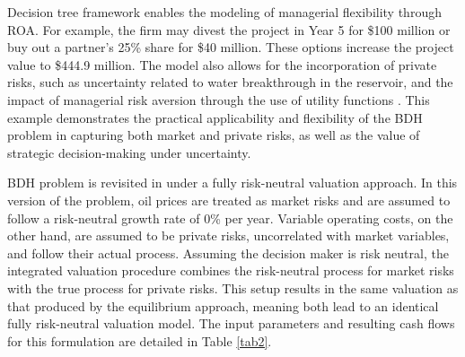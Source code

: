 \documentclass[pdflatex,sn-basic]{sn-jnl}%
\theoremstyle{thmstyleone}%
\theoremstyle{thmstyletwo}%
\theoremstyle{thmstylethree}%
\begin{document}
Decision tree framework enables the modeling of managerial flexibility through ROA. For example, the firm may divest the project in Year 5 for \$100 million or buy out a partner's 25\% share for \$40 million. These options increase the project value to \$444.9 million. The model also allows for the incorporation of private risks, such as uncertainty related to water breakthrough in the reservoir, and the impact of managerial risk aversion through the use of utility functions \citep{ref12}. This example demonstrates the practical applicability and flexibility of the BDH problem in capturing both market and private risks, as well as the value of strategic decision-making under uncertainty.

BDH problem is revisited in \cite{ref13} under a fully risk-neutral valuation approach. In this version of the problem, oil prices are treated as market risks and are assumed to follow a risk-neutral growth rate of 0\% per year. Variable operating costs, on the other hand, are assumed to be private risks, uncorrelated with market variables, and follow their actual process. Assuming the decision maker is risk neutral, the integrated valuation procedure combines the risk-neutral process for market risks with the true process for private risks. This setup results in the same valuation as that produced by the equilibrium approach, meaning both lead to an identical fully risk-neutral valuation model. The input parameters and resulting cash flows for this formulation are detailed in Table \ref{tab2}.
\end{document}
